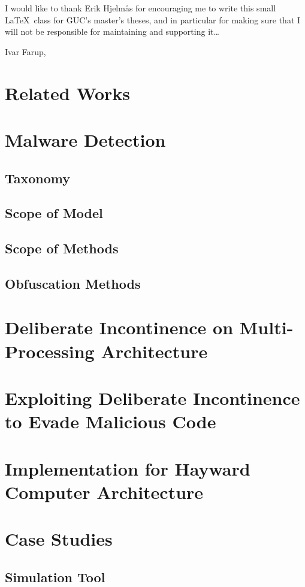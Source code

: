 \documentclass[medieteknikk]{gucmasterthesis}
\begin{document}
I would like to thank Erik Hjelmås for encouraging me to write this
small \LaTeX\ class for GUC's master's theses, and in particular for
making sure that I will not be responsible for maintaining and
supporting it\dots

\vspace{\baselineskip}
\noindent Ivar Farup, \gucmasterthesisdate
 
\tableofcontents
\listoffigures
\listoftables


\chapter{Related Works}
\chapter{Malware Detection}
\section{Taxonomy}
\section{Scope of Model}
\section{Scope of Methods}
\section{Obfuscation Methods}

\chapter{Deliberate Incontinence on Multi-Processing Architecture}
\chapter{Exploiting Deliberate Incontinence to Evade Malicious Code}
\chapter{Implementation for Hayward Computer Architecture}
\chapter{Case Studies}
\section{Simulation Tool}
\end{document}
